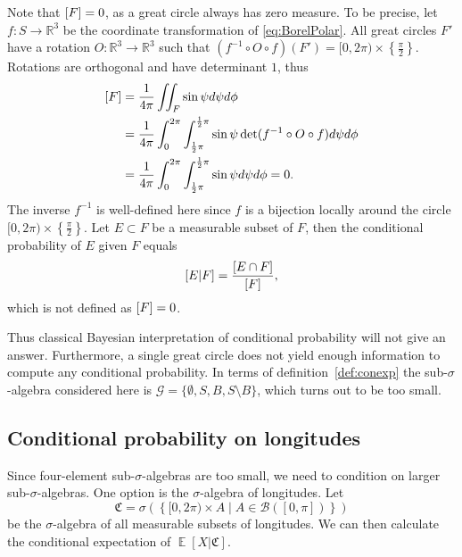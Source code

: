 \documentclass[twoside,a4paper]{report}
\theoremstyle{plain}
\theoremstyle{definition}
\theoremstyle{remark}
\numberwithin{equation}{chapter}
\newcommand{\R}{\mathbb{R}}
\let\P\relax
\DeclareMathOperator{\P}{\mathbb{P}}
\DeclareMathOperator{\E}{\mathbb{E}}
\DeclareMathOperator{\1}{\mathbbm{1}}
\renewcommand{\G}{\mathcal{G}}
\newcommand{\B}{\mathcal{B}}
\begin{document}
Note that $\P[F]=0$, as a great circle always has zero measure. To be precise, let $f\colon S\to\R^3$ be the coordinate transformation of \eqref{eq:BorelPolar}. All great circles $F'$ have a rotation $O\colon\R^3\to\R^3$ such that $(f^{-1}\circ O\circ f)(F')=[0,2\pi)\times\left\{\frac{\pi}{2}\right\}$. Rotations are orthogonal and have determinant $1$, thus
\begin{align}
\P[F]&=\frac{1}{4\pi}\iint_F\sin\psi d\psi d\phi\\
&=\frac{1}{4\pi}\int_0^{2\pi}\int_{\frac{1}{2}\pi}^{\frac{1}{2}\pi}\sin\psi \det(f^{-1}\circ O\circ f)d\psi d\phi\\
&=\frac{1}{4\pi}\int_0^{2\pi}\int_{\frac{1}{2}\pi}^{\frac{1}{2}\pi}\sin\psi d\psi d\phi=0.
\end{align}
The inverse $f^{-1}$ is well-defined here since $f$ is a bijection locally around the circle $[0,2\pi)\times\left\{\frac{\pi}{2}\right\}$. Let $E\subset F$ be a measurable subset of $F$, then the conditional probability of $E$ given $F$ equals
\begin{equation}
\P[E|F]=\frac{\P[E\cap F]}{\P[F]},
\end{equation}
which is not defined as $\P[F]=0$.

Thus classical Bayesian interpretation of conditional probability will not give an answer. Furthermore, a single great circle does not yield enough information to compute any conditional probability. In terms of definition~\ref{def:conexp} the sub-$\sigma$-algebra considered here is $\G=\{\emptyset,S,B,S\setminus B\}$, which turns out to be too small.

\subsection{Conditional probability on longitudes}\label{sec:BorelLong}
Since four-element sub-$\sigma$-algebras are too small, we need to condition on larger sub-$\sigma$-algebras. One option is the $\sigma$-algebra of longitudes. Let
\begin{equation}
\mathfrak{C}=\sigma\left(\left\{[0,2\pi)\times A\mid A\in\B([0,\pi])\right\}\right)
\end{equation}
be the $\sigma$-algebra of all measurable subsets of longitudes. We can then calculate the conditional expectation of $\E[X|\mathfrak{C}]$.
\end{document}
